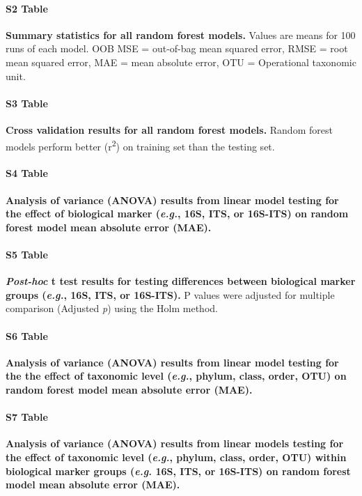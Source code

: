 \documentclass[
  10pt,
  letterpaper,
]{article}
\begin{document}
\paragraph*{S2 Table}
\label{s2-table}
{\textbf{Summary statistics for all random forest models.}} Values are
means for 100 runs of each model. OOB MSE = out-of-bag mean squared
error, RMSE = root mean squared error, MAE = mean absolute error, OTU =
Operational taxonomic unit.

\paragraph*{S3 Table}
\label{test-train-table}
{\textbf{Cross validation results for all random forest models.}} Random
forest models perform better (r\textsuperscript{2}) on training set than
the testing set.

\paragraph*{S4 Table}
\label{s3-table}
{\textbf{Analysis of variance (ANOVA) results from linear model testing
for the effect of biological marker (\emph{e.g.}, 16S, ITS, or 16S-ITS)
on random forest model mean absolute error (MAE).}}

\paragraph*{S5 Table}
\label{s4-table}
{\textbf{\emph{Post-hoc} t test results for testing differences between
biological marker groups (\emph{e.g.}, 16S, ITS, or 16S-ITS).}} P values
were adjusted for multiple comparison (Adjusted \emph{p}) using the Holm
method.

\paragraph*{S6 Table}
\label{s5-table}
{\textbf{Analysis of variance (ANOVA) results from linear model testing
for the the effect of taxonomic level (\emph{e.g.}, phylum, class,
order, OTU) on random forest model mean absolute error (MAE).}}

\paragraph*{S7 Table}
\label{s6-table}
{\textbf{Analysis of variance (ANOVA) results from linear models testing
for the effect of taxonomic level (\emph{e.g.}, phylum, class, order,
OTU) within biological marker groups (\emph{e.g.} 16S, ITS, or 16S-ITS)
on random forest model mean absolute error (MAE).}}
\end{document}

